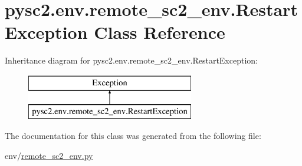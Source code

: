 \hypertarget{classpysc2_1_1env_1_1remote__sc2__env_1_1_restart_exception}{}\section{pysc2.\+env.\+remote\+\_\+sc2\+\_\+env.\+Restart\+Exception Class Reference}
\label{classpysc2_1_1env_1_1remote__sc2__env_1_1_restart_exception}
Inheritance diagram for pysc2.\+env.\+remote\+\_\+sc2\+\_\+env.\+Restart\+Exception\+:\begin{figure}[H]
\begin{center}
\leavevmode
\includegraphics[height=2.000000cm]{classpysc2_1_1env_1_1remote__sc2__env_1_1_restart_exception}
\end{center}
\end{figure}


The documentation for this class was generated from the following file\+:\begin{DoxyCompactItemize}
\item 
env/\mbox{\hyperlink{remote__sc2__env_8py}{remote\+\_\+sc2\+\_\+env.\+py}}\end{DoxyCompactItemize}
